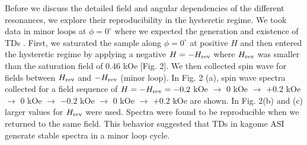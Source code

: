 \documentclass[aps,prl,preprint,showpacs,superscriptaddress,groupedaddress]{revtex4}%
\begin{document}
Before we discuss the detailed field and angular dependencies of the different resonances, we explore their reproducibility in the hysteretic regime. We took data in minor loops at $\phi = 0^{\circ}$ where we expected the generation and existence of TDs \cite{bhat2016magnetization}.  First, we saturated the sample along $\phi = 0^{\circ}$ at positive $H$ and then entered the hysteretic regime by applying a negative $H=-H_{\rm rev}$ where $H_{\rm rev}$ was smaller than the saturation field of 0.46 kOe [Fig. 2]. We then collected spin wave for fields between $H_{\rm rev}$ and $-H_{\rm rev}$ (minor loop).  In Fig. 2 (a),  spin wave spectra collected for a field sequence of $H=-H_{\rm rev}=-0.2 $ kOe  $ \rightarrow $  $ 0   $  kOe  $ \rightarrow $   $ +0.2  $ kOe  $ \rightarrow $  $ 0 $  kOe  $ \rightarrow $  $ -0.2 $  kOe  $ \rightarrow $  $ 0 $  kOe  $ \rightarrow $   $ +0.2 $  kOe are shown. In Fig. 2(b) and (c) larger values for $H_{\rm rev}$ were used. Spectra were found to be reproducible when we returned to  the same field. This behavior suggested that TDs in kagome ASI generate stable spectra in a minor loop cycle.  \\
\end{document}
